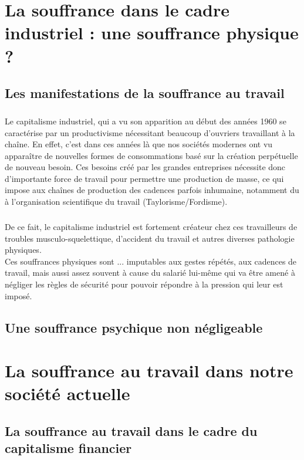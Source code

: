 \documentclass{report}
\begin{document}
\chapter{La souffrance dans le cadre industriel : une souffrance physique ?}
	\section{Les manifestations de la souffrance au travail}
		\paragraph{}
			Le capitalisme industriel, qui a vu son apparition au début des années 1960 se caractérise par un productivisme nécessitant beaucoup d'ouvriers travaillant à la chaîne. En effet, c'est dans ces années là que nos sociétés modernes ont vu apparaître de nouvelles formes de consommations basé sur la création perpétuelle de nouveau besoin. Ces besoins créé par les grandes entreprises nécessite donc d'importante force de travail pour permettre une production de masse, ce qui impose aux chaînes de production des cadences parfois inhumaine, notamment du à l'organisation scientifique du travail (Taylorisme/Fordisme).

		\paragraph{}
			De ce fait, le capitalisme industriel est fortement créateur chez ces travailleurs de troubles musculo-squelettique, d'accident du travail et autres diverses pathologie physiques.\\
			Ces souffrances physiques sont ... imputables aux gestes répétés, aux cadences de travail, mais aussi assez souvent à cause du salarié lui-même qui va être amené à négliger les règles de sécurité pour pouvoir répondre à la pression qui leur est imposé. 

	\section{Une souffrance psychique non négligeable}

\chapter{La souffrance au travail dans notre société actuelle}
	\section{La souffrance au travail dans le cadre du capitalisme financier}
\end{document}
